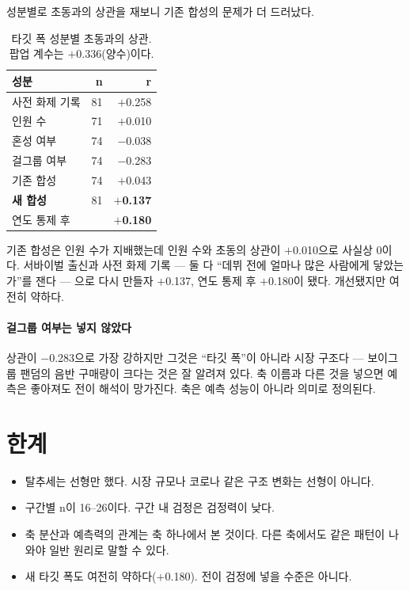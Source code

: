 \documentclass[10pt]{article}
\begin{document}
성분별로 초동과의 상관을 재보니 기존 합성의 문제가 더 드러났다.

\begin{table}[t]
\centering\tsize
\caption{타깃 폭 성분별 초동과의 상관. 팝업 계수는 $+$0.336(양수)이다.}
\begin{tabular}{lrr}
\toprule
성분 & n & r \\
\midrule
사전 화제 기록 & 81 & $+$0.258 \\
인원 수 & 71 & $+$0.010 \\
혼성 여부 & 74 & $-$0.038 \\
걸그룹 여부 & 74 & $-$0.283 \\
\midrule
기존 합성 & 74 & $+$0.043 \\
\textbf{새 합성} & 81 & \textbf{$+$0.137} \\
\hspace{1em}연도 통제 후 & & \textbf{$+$0.180} \\
\bottomrule
\end{tabular}
\end{table}

기존 합성은 인원 수가 지배했는데 인원 수와 초동의 상관이 $+$0.010으로 사실상
0이다. 서바이벌 출신과 사전 화제 기록 --- 둘 다 ``데뷔 전에 얼마나 많은 사람에게
닿았는가''를 잰다 --- 으로 다시 만들자 $+$0.137, 연도 통제 후 $+$0.180이 됐다.
개선됐지만 여전히 약하다.

\paragraph{걸그룹 여부는 넣지 않았다}
상관이 $-$0.283으로 가장 강하지만 그것은 ``타깃 폭''이 아니라 시장 구조다 ---
보이그룹 팬덤의 음반 구매량이 크다는 것은 잘 알려져 있다. 축 이름과 다른 것을
넣으면 예측은 좋아져도 전이 해석이 망가진다. 축은 예측 성능이 아니라 의미로
정의된다.

\section{한계}

\begin{itemize}[leftmargin=1.1em,itemsep=0.15em]
\item 탈추세는 선형만 했다. 시장 규모나 코로나 같은 구조 변화는 선형이 아니다.
\item 구간별 n이 16--26이다. 구간 내 검정은 검정력이 낮다.
\item 축 분산과 예측력의 관계는 축 하나에서 본 것이다. 다른 축에서도 같은
      패턴이 나와야 일반 원리로 말할 수 있다.
\item 새 타깃 폭도 여전히 약하다($+$0.180). 전이 검정에 넣을 수준은 아니다.
\end{itemize}
\end{document}
